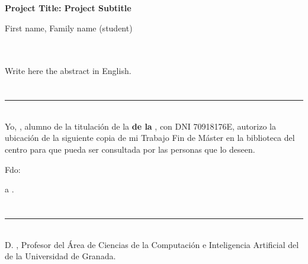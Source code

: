 \cleardoublepage


\thispagestyle{empty}
%
%
\begin{center}
{\large\bfseries Project Title: Project Subtitle}\\
\end{center}
\begin{center}
First name, Family name (student)\\
\end{center}

\\

\vspace{0.7cm}
\\

Write here the abstract in English.
%
\chapter*{}
\thispagestyle{empty}

\noindent\rule[-1ex]{\textwidth}{2pt}\\[4.5ex]

Yo, \textbf{\myName}, alumno de la titulación \myDegree de la \textbf{\myFaculty de la \myUni}, con DNI 70918176E, autorizo la
ubicación de la siguiente copia de mi Trabajo Fin de Máster en la biblioteca del centro para que pueda ser
consultada por las personas que lo deseen.

\vspace{6cm}

\noindent Fdo: \myName

\vspace{2cm}

\begin{flushright}
\myLocation a \myTime.
\end{flushright}


\chapter*{}
\thispagestyle{empty}

\noindent\rule[-1ex]{\textwidth}{2pt}\\[4.5ex]

D. \textbf{\myProf}, Profesor del Área de Ciencias de la Computación e Inteligencia Artificial del \myDepartment
 de la Universidad de Granada.

\vspace{0.5cm}

